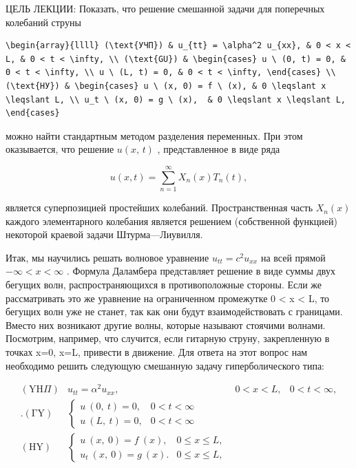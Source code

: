 \documentclass[
  ukrainian,
]{article}
\begin{document}
ЦЕЛЬ ЛЕКЦИИ: Показать, что решение смешанной задачи для поперечных
колебаний струны

\begin{verbatim}
\begin{array}{llll} (\text{УЧП}) & u_{tt} = \alpha^2 u_{xx}, & 0 < x < L, & 0 < t < \infty, \\ (\text{GU}) & \begin{cases} u \ (0, t) = 0, & 0 < t < \infty, \\ u \ (L, t) = 0, & 0 < t < \infty, \end{cases} \\ (\text{НУ}) & \begin{cases} u \ (x, 0) = f \ (x), & 0 \leqslant x \leqslant L, \\ u_t \ (x, 0) = g \ (x),  & 0 \leqslant x \leqslant L, \end{cases}
\end{verbatim}

можно найти стандартным методом разделения переменных. При этом
оказывается, что решение \(u\left(x,\,t\right)\) , представленное в виде
ряда

\[
u(x, t) = \sum_{n=1}^{\infty} X_n(x) T_n(t),
\]

является суперпозицией простейших колебаний. Пространственная часть
\(X_n(x)\) каждого элементарного колебания является решением
(собственной функцией) некоторой краевой задачи Штурма---Лиувилля.

Итак, мы научились решать волновое уравнение \(u_{tt}=c^2u_{xx}\) на
всей прямой \(-\infty < x < \infty\) . Формула Даламбера представляет
решение в виде суммы двух бегущих волн, распространяющихся в
противоположные стороны. Если же рассматривать это же уравнение на
ограниченном промежутке 0 \textless{} x \textless{} L, то бегущих волн
уже не станет, так как они будут взаимодействовать с границами. Вместо
них возникают другие волны, которые называют стоячими волнами.
Посмотрим, например, что случится, если гитарную струну, закрепленную в
точках x=0, x=L, привести в движение. Для ответа на этот вопрос нам
необходимо решить следующую смешанную задачу гиперболического типа:

\[
\begin{array}{llll} (\mathrm{Y}\mathrm{H}\Pi) & u_{tt} = \alpha^2 u_{xx}, & 0 < x < L, & 0 < t < \infty, \\ . (\mathrm{\Gamma}\mathrm{Y}) & \begin{cases} u \ (0, \ t) = 0, & 0 < t < \infty \\ u \ (L, \ t) = 0, & 0 < t < \infty \end{cases} \\ (\mathrm{H}\mathrm{Y}) & \begin{cases} u \ (x, \ 0) = f \ (x), & 0 \leqslant x \leqslant L, \\ u_t \ (x, \ 0) = g \ (x). & 0 \leqslant x \leqslant L, \end{cases} \end{array}
\]
\end{document}
